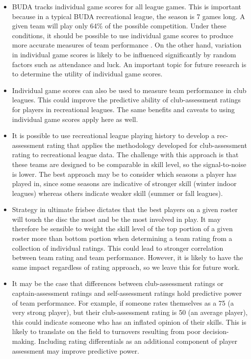 \begin{itemize}

\item BUDA tracks individual game scores for all league games. This is important because in a typical BUDA recreational league, the season is 7 games long. A given team will play only 64\% of the possible competition. Under these conditions, it should be possible to use individual game scores to produce more accurate measures of team performance \cite{Langville_2012}. On the other hand, variation in individual game scores is likely to be influenced significantly by random factors such as attendance and luck. An important topic for future research is to determine the utility of individual game scores.

\item Individual game scores can also be used to measure team performance in club leagues. This could improve the predictive ability of club-assessment ratings for players in recreational leagues. The same benefits and caveats to using individual game scores apply here as well.

\item It is possible to use recreational league playing history to develop a rec-assessment rating that applies the methodology developed for club-assessment rating to recreational league data. The challenge with this approach is that these teams are designed to be comparable in skill level, so the signal-to-noise is lower. The best approach may be to consider which seasons a player has played in, since some seasons are indicative of stronger skill (winter indoor leagues) whereas others indicate weaker skill (summer or fall leagues).

\item Strategy in ultimate frisbee dictates that the best players on a given roster will touch the disc the most and be the most involved in play.  It may therefore be sensible to weight the skill level of the top portion of a given roster more than bottom portion when determining a team rating from a collection of individual ratings. This could lead to stronger correlation between team rating and team performance. However, it is likely to have the same impact regardless of rating approach, so we leave this for future work.

\item It may be the case that differences between club-assessment ratings or captain-assessment ratings and self-assessment ratings hold predictive power of team performance. For example, if someone rates themselves as a 75 (a very strong player), but their club-assessment rating is 50 (an average player), this could indicate someone who has an inflated opinion of their skills. This is likely to translate on the field to turnovers resulting from poor decision-making.  Including rating differentials as an additional component of player assessment may improve predictive power.


\end{itemize}
